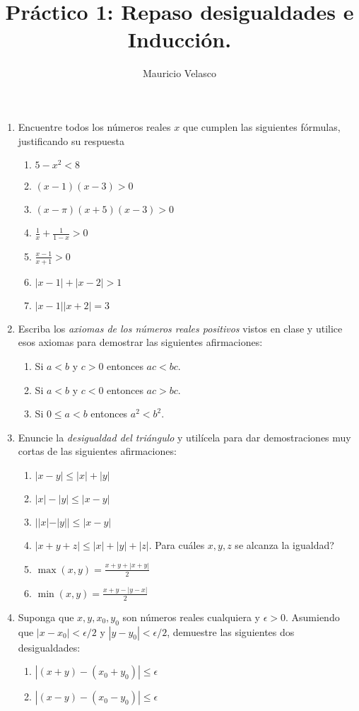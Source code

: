 \documentclass[12pt, a4paper]{article}
\date{}
\begin{document}
\title{Pr\'actico 1: Repaso desigualdades e Inducción.}
\author{Mauricio Velasco}
\maketitle{}
\begin{enumerate} 
\item Encuentre todos los números reales $x$ que cumplen las siguientes fórmulas, justificando su respuesta

\begin{enumerate}
\item $5-x^2<8$
\item $(x-1)(x-3)>0$
\item $(x-\pi)(x+5)(x-3)>0$
\item $\frac{1}{x}+\frac{1}{1-x}>0$
\item $\frac{x-1}{x+1}>0$
\item $|x-1|+|x-2|>1$
\item $|x-1||x+2|=3$
\end{enumerate}

\item Escriba los \emph{axiomas de los números reales positivos} vistos en clase y utilice esos axiomas para demostrar las siguientes afirmaciones:
\begin{enumerate}
\item Si $a<b$ y $c>0$ entonces $ac<bc$.
\item Si $a<b$ y $c<0$ entonces $ac>bc$.
\item Si $0\leq a<b$ entonces $a^2<b^2$.
\end{enumerate}

\item Enuncie la \emph{desigualdad del triángulo} y utilícela para dar demostraciones muy cortas de las siguientes afirmaciones:
\begin{enumerate}
\item $|x-y|\leq |x|+|y|$
\item $|x|-|y|\leq |x-y|$
\item $||x|-|y||\leq |x-y|$ 
\item $|x+y+z|\leq |x|+|y|+|z|$. Para cuáles $x,y,z$ se alcanza la igualdad? 
\item $\max(x,y)=\frac{x+y+|x+y|}{2}$
\item $\min(x,y)=\frac{x+y-|y-x|}{2}$
\end{enumerate}

\item Suponga que $x,y,x_0,y_0$ son números reales cualquiera y $\epsilon>0$. 
Asumiendo que $|x-x_0|<\epsilon/2$ y $|y-y_0|<\epsilon/2$, demuestre las siguientes dos desigualdades:
\begin{enumerate}
\item $|(x+y)-(x_0+y_0)|\leq \epsilon$
\item $|(x-y)-(x_0-y_0)|\leq \epsilon$
\end{enumerate}
  

\end{enumerate}
\end{document}
